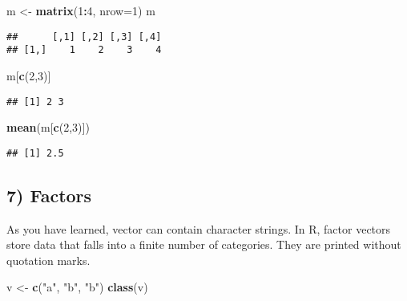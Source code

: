 \documentclass[
]{article}
\newenvironment{Shaded}{\begin{snugshade}}{\end{snugshade}}
\newcommand{\DataTypeTok}[1]{\textcolor[rgb]{0.13,0.29,0.53}{#1}}
\newcommand{\DecValTok}[1]{\textcolor[rgb]{0.00,0.00,0.81}{#1}}
\newcommand{\KeywordTok}[1]{\textcolor[rgb]{0.13,0.29,0.53}{\textbf{#1}}}
\newcommand{\NormalTok}[1]{#1}
\newcommand{\OperatorTok}[1]{\textcolor[rgb]{0.81,0.36,0.00}{\textbf{#1}}}
\newcommand{\StringTok}[1]{\textcolor[rgb]{0.31,0.60,0.02}{#1}}
\begin{document}
\begin{Shaded}
\begin{Highlighting}[]
\NormalTok{m <-}\StringTok{ }\KeywordTok{matrix}\NormalTok{(}\DecValTok{1}\OperatorTok{:}\DecValTok{4}\NormalTok{, }\DataTypeTok{nrow=}\DecValTok{1}\NormalTok{)}
\NormalTok{m}
\end{Highlighting}
\end{Shaded}

\begin{verbatim}
##      [,1] [,2] [,3] [,4]
## [1,]    1    2    3    4
\end{verbatim}

\begin{Shaded}
\begin{Highlighting}[]
\NormalTok{m[}\KeywordTok{c}\NormalTok{(}\DecValTok{2}\NormalTok{,}\DecValTok{3}\NormalTok{)]}
\end{Highlighting}
\end{Shaded}

\begin{verbatim}
## [1] 2 3
\end{verbatim}

\begin{Shaded}
\begin{Highlighting}[]
\KeywordTok{mean}\NormalTok{(m[}\KeywordTok{c}\NormalTok{(}\DecValTok{2}\NormalTok{,}\DecValTok{3}\NormalTok{)])}
\end{Highlighting}
\end{Shaded}

\begin{verbatim}
## [1] 2.5
\end{verbatim}

\hypertarget{factors}{%
\subsection{7) Factors}\label{factors}}

As you have learned, vector can contain character strings. In R, factor
vectors store data that falls into a finite number of categories. They
are printed without quotation marks.

\begin{Shaded}
\begin{Highlighting}[]
\NormalTok{v <-}\StringTok{ }\KeywordTok{c}\NormalTok{(}\StringTok{"a"}\NormalTok{, }\StringTok{"b"}\NormalTok{, }\StringTok{"b"}\NormalTok{)}
\KeywordTok{class}\NormalTok{(v)}
\end{Highlighting}
\end{Shaded}
\end{document}
